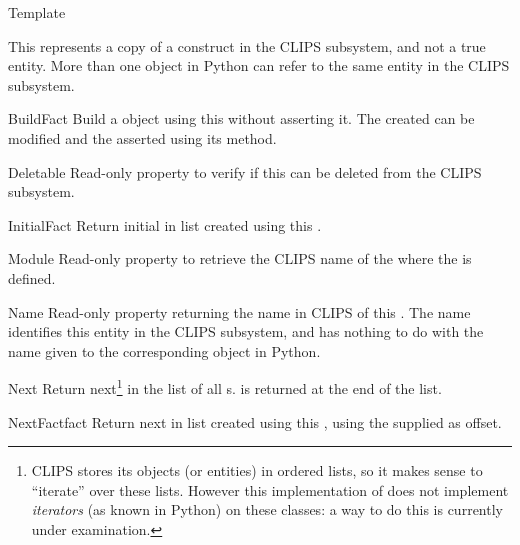 \begin{classdesc*}{Template}

This represents a copy of a  construct in the CLIPS
subsystem, and not a true  entity. More than one
 object in Python can refer to the same
 entity in the CLIPS subsystem.

\begin{methoddesc}{BuildFact}{}
Build a  object using this  without
asserting it. The created   can be modified and
the  asserted using its  method.
\end{methoddesc}

\begin{memberdesc}[property]{Deletable}
Read-only property to verify if this  can be deleted
from the CLIPS subsystem.
\end{memberdesc}

\begin{methoddesc}{InitialFact}{}
Return initial  in list created using this .
\end{methoddesc}

\begin{memberdesc}[property]{Module}
Read-only property to retrieve the CLIPS name of the 
where the  is defined.
\end{memberdesc}

\begin{memberdesc}[property]{Name}
Read-only property returning the name in CLIPS of this .
The name identifies this entity in the CLIPS subsystem, and has nothing
to do with the name given to the corresponding object in Python.
\end{memberdesc}

\begin{methoddesc}{Next}{}
Return next\footnote{CLIPS stores its objects (or entities) in ordered
lists, so it makes sense to ``iterate'' over these lists. However this
implementation of \pyclips{} does not implement \emph{iterators} (as
known in Python) on these classes: a way to do this is currently under
examination.}  in the list of all s.
 is returned at the end of the list.
\end{methoddesc}

\begin{methoddesc}{NextFact}{fact}
Return next  in list created using this ,
using the supplied  as offset.
\end{methoddesc}


\end{classdesc*}
